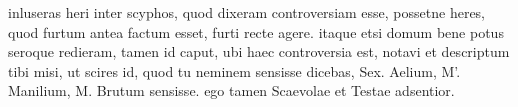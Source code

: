 


 inluseras heri inter scyphos, quod dixeram controversiam esse, possetne heres, quod furtum antea factum esset, furti recte agere. itaque etsi domum bene potus seroque redieram, tamen id caput, ubi haec controversia est, notavi et descriptum tibi misi, ut scires id, quod tu neminem sensisse dicebas, Sex. Aelium, M'. Manilium, M. Brutum sensisse. ego tamen Scaevolae et Testae adsentior.
